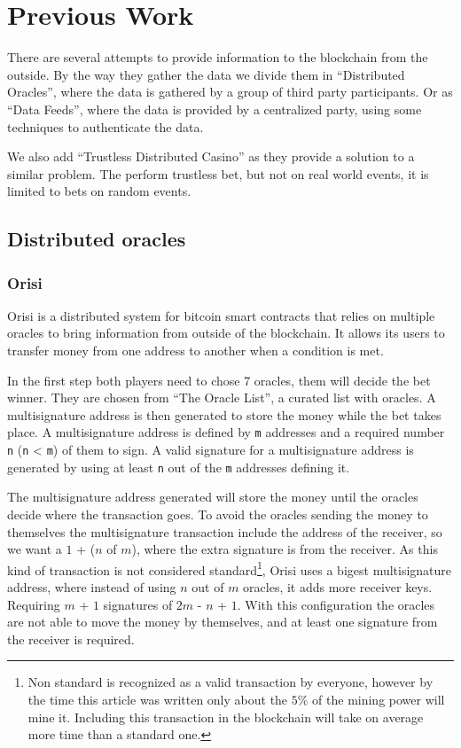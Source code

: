 \section{Previous Work} \label{sec:previous_work}

There are several attempts to provide information to the blockchain from the
  outside.
By the way they gather the data we divide them in ``Distributed Oracles'', where
  the data is gathered by a group of third party participants.
Or as ``Data Feeds'', where the data is provided by a centralized party, using
  some techniques to authenticate the data.

We also add ``Trustless Distributed Casino'' as they provide a solution to a
  similar problem.
The perform trustless bet, but not  on real world events, it is limited to
  bets on random events.

\subsection{Distributed oracles}
\subsubsection{Orisi}
Orisi \cite{orisiwhitepaper} is a distributed system for bitcoin smart
  contracts that relies on multiple oracles to bring information from outside
  of the blockchain.
It allows its users to transfer money from one address to another when a
  condition is met.

In the first step both players need to chose 7 oracles, them will decide the
  bet winner.
They are chosen from ``The Oracle List'', a curated list with oracles.
A multisignature address is then generated to store the money while the bet
  takes place.
A multisignature address is defined by \texttt{m} addresses and a required
  number \texttt{n} (\texttt{n} < \texttt{m}) of them to sign. A valid
  signature for a multisignature address is generated by using at least
  \texttt{n} out of the \texttt{m} addresses defining it.

The multisignature address generated will store the money until the oracles
  decide where the transaction goes. To avoid the oracles sending the money
  to themselves the multisignature transaction include the address of the
  receiver, so we want a $1$ + ($n$ of $m$), where the extra signature is
  from the receiver. As this kind of transaction is not considered
  standard\footnote{Non standard is recognized as a valid transaction by
  everyone, however by the time this article was written only about the $5\%$ of
  the mining power will mine it. Including this transaction in the blockchain
  will take on average more time than a standard one.},
  Orisi uses a bigest multisignature address, where instead of using
  $n$ out of $m$ oracles, it adds more receiver keys. Requiring $m$ + $1$
  signatures of $2m$ - $n$ + $1$. With this configuration the oracles are
  not able to move the money by themselves, and at least one signature
  from the receiver is required.

